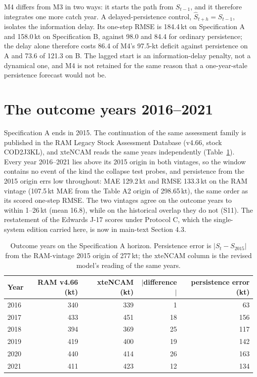 M4 differs from M3 in two ways: it starts the path from $S_{t-1}$, and it therefore integrates one more catch year. A delayed-persistence control, $\hat S_{t+h} = S_{t-1}$, isolates the information delay. Its one-step RMSE is 184.4\,kt on Specification A and 158.0\,kt on Specification B, against 98.0 and 84.4 for ordinary persistence; the delay alone therefore costs 86.4 of M4's 97.5-kt deficit against persistence on A and 73.6 of 121.3 on B. The lagged start is an information-delay penalty, not a dynamical one, and M4 is not retained for the same reason that a one-year-stale persistence forecast would not be.

\FloatBarrier
\section{The outcome years 2016--2021}\label{si:outcome}

Specification A ends in 2015. The continuation of the same assessment family is published in the RAM Legacy Stock Assessment Database (v4.66, stock COD2J3KL), and xteNCAM reads the same years independently (Table~\ref{tab:si_outcome}). Every year 2016--2021 lies above its 2015 origin in both vintages, so the window contains no event of the kind the collapse test probes, and persistence from the 2015 origin errs low throughout: MAE 129.2\,kt and RMSE 133.3\,kt on the RAM vintage (107.5\,kt MAE from the Table A2 origin of 298.65\,kt), the same order as its scored one-step RMSE. The two vintages agree on the outcome years to within 1--26\,kt (mean 16.8), while on the historical overlap they do not (S11). The restatement of the Edwards J-17 scores under Protocol C, which the single-system edition carried here, is now in main-text Section 4.3.

\begin{table}[!htb]
\centering\small
\caption{Outcome years on the Specification A horizon. Persistence error is $|S_t - S_{2015}|$ from the RAM-vintage 2015 origin of 277\,kt; the xteNCAM column is the revised model's reading of the same years.}
\label{tab:si_outcome}
\begin{tabular}{@{}lrrrr@{}}
\toprule
Year & RAM v4.66 (kt) & xteNCAM (kt) & $|$difference$|$ & persistence error (kt) \\
\midrule
2016 & 340 & 339 & 1 & 63 \\
2017 & 433 & 451 & 18 & 156 \\
2018 & 394 & 369 & 25 & 117 \\
2019 & 419 & 400 & 19 & 142 \\
2020 & 440 & 414 & 26 & 163 \\
2021 & 411 & 423 & 12 & 134 \\
\bottomrule
\end{tabular}
\end{table}
